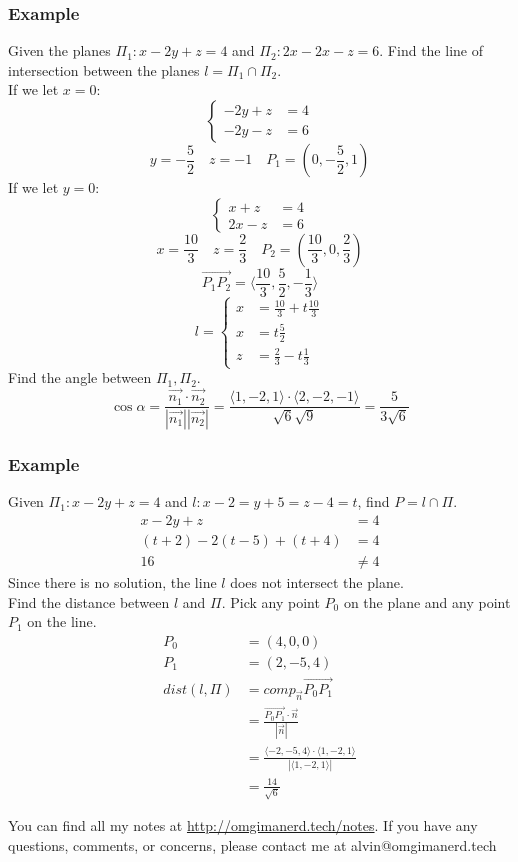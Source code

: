 \documentclass[letterpaper, 12pt]{math}
\begin{document}
\subsubsection*{Example}
Given the planes \( \Pi_1: x-2y+z = 4 \) and \( \Pi_2: 2x-2x-z = 6 \). Find the
line of intersection between the planes \( l = \Pi_1\cap\Pi_2 \). \\
If we let \( x = 0 \):
\[ \begin{cases}
  -2y+z &= 4 \\
  -2y-z &= 6
\end{cases} \]
\[ y = -\frac{5}{2} \quad z = -1 \quad P_1 = (0,-\frac{5}{2},1) \]
If we let \( y = 0 \):
\[ \begin{cases}
  x+z &= 4 \\
  2x-z &= 6
\end{cases} \]
\[ x = \frac{10}{3} \quad z = \frac{2}{3} \quad P_2 =
  (\frac{10}{3},0,\frac{2}{3}) \]
\[ \overrightarrow{P_1P_2} =
  \langle\frac{10}{3},\frac{5}{2},-\frac{1}{3}\rangle \]
\[ l = \begin{cases}
  x &= \frac{10}{3}+t\frac{10}{3} \\
  x &= t\frac{5}{2} \\
  z &= \frac{2}{3}-t\frac{1}{3}
\end{cases} \]
Find the angle between \( \Pi_1,\Pi_2 \).
\[ \cos\alpha = \frac{\vec{n_1}\cdot\vec{n_2}}{|\vec{n_1}||\vec{n_2}|} =
  \frac{\langle1,-2,1\rangle\cdot\langle2,-2,-1\rangle}{\sqrt{6}\sqrt{9}} =
  \frac{5}{3\sqrt{6}} \]

\subsubsection*{Example}
Given \( \Pi_1: x-2y+z = 4 \) and \( l: x-2 = y+5 = z-4 = t \), find
\( P = l\cap\Pi \).
\begin{align*}
  x-2y+z &= 4 \\
  (t+2)-2(t-5)+(t+4) &= 4 \\
  16 &\ne 4
\end{align*}
Since there is no solution, the line \( l \) does not intersect the plane. \\
Find the distance between \( l \) and \( \Pi \). Pick any point \( P_0 \) on
the plane and any point \( P_1 \) on the line.
\begin{align*}
  P_0 &= (4,0,0) \\
  P_1 &= (2,-5,4) \\
  dist(l,\Pi) &= comp_{\vec{n}}{\overrightarrow{P_0P_1}} \\
  &= \frac{\overrightarrow{P_0P_1}\cdot\vec{n}}{|\vec{n}|} \\
  &= \frac{\langle-2,-5,4\rangle\cdot\langle1,-2,1\rangle}
    {|\langle1,-2,1\rangle|} \\
  &= \frac{14}{\sqrt{6}}
\end{align*}

\begin{center}
  You can find all my notes at \url{http://omgimanerd.tech/notes}. If you have
  any questions, comments, or concerns, please contact me at
  alvin@omgimanerd.tech
\end{center}
\end{document}
